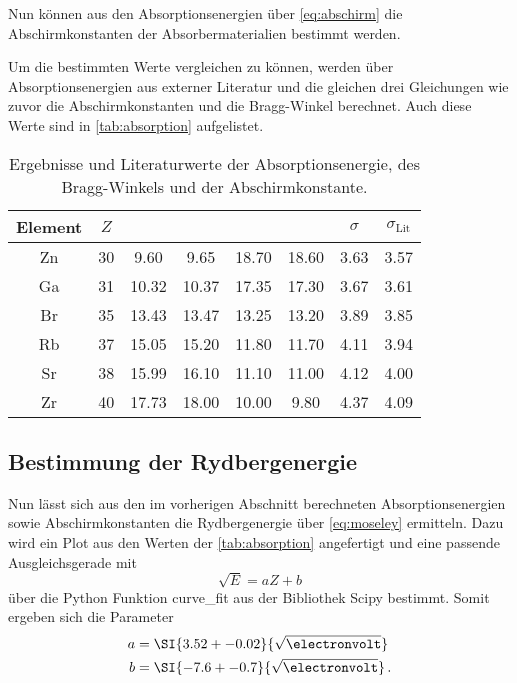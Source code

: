 Nun können aus den Absorptionsenergien über \autoref{eq:abschirm} die Abschirmkonstanten der Absorbermaterialien bestimmt werden.

Um die bestimmten Werte vergleichen zu können, werden über Absorptionsenergien aus externer Literatur und die gleichen drei Gleichungen wie zuvor die Abschirmkonstanten und die Bragg-Winkel berechnet.
Auch diese Werte sind in \autoref{tab:absorption} aufgelistet.

\begin{table}
    \centering
    \caption{Ergebnisse und Literaturwerte der Absorptionsenergie, des Bragg-Winkels und der Abschirmkonstante.\cite{absorption}}
    \begin{tabular}{c S[table-format=1.0] S S S S S S}
        \toprule
        Element & $Z$ &  &  & \tableSI{\theta}{\degree} &  & $\sigma$ & $\sigma_\text{Lit}$ \\
        \midrule
        Zn & 30 & 9.60 & 9.65 & 18.70 & 18.60 & 3.63 & 3.57 \\
        Ga & 31 & 10.32 & 10.37 & 17.35 & 17.30 & 3.67 & 3.61 \\
        Br & 35 & 13.43 & 13.47 & 13.25 & 13.20 & 3.89 & 3.85 \\
        Rb & 37 & 15.05 & 15.20 & 11.80 & 11.70 & 4.11 & 3.94 \\
        Sr & 38 & 15.99 & 16.10 & 11.10 & 11.00 & 4.12 & 4.00 \\
        Zr & 40 & 17.73 & 18.00 & 10.00 & 9.80 & 4.37 & 4.09 \\
        \bottomrule
    \end{tabular}
    \label{tab:absorption}
\end{table}



\subsection{Bestimmung der Rydbergenergie}
\label{ssec:rydberg}

Nun lässt sich aus den im vorherigen Abschnitt berechneten Absorptionsenergien sowie Abschirmkonstanten die Rydbergenergie über \autoref{eq:moseley} ermitteln.
Dazu wird ein Plot aus den Werten der \autoref{tab:absorption} angefertigt und eine passende Ausgleichsgerade mit
\begin{equation*}
    \sqrt{E} = aZ+b
\end{equation*}
über die Python Funktion curve\_fit aus der Bibliothek Scipy bestimmt.
Somit ergeben sich die Parameter
\begin{align*}
    a &= \SI{3.52+-0.02}{\sqrt{\electronvolt}} \\
    b &= \SI{-7.6+-0.7}{\sqrt{\electronvolt}} \,.
\end{align*}

